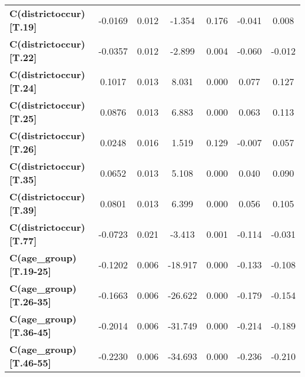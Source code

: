\begin{center}
\begin{tabular}{lcccccc}
\textbf{C(districtoccur)[T.19]}                                                   &      -0.0169  &        0.012     &    -1.354  &         0.176        &       -0.041    &        0.008     \\
\textbf{C(districtoccur)[T.22]}                                                   &      -0.0357  &        0.012     &    -2.899  &         0.004        &       -0.060    &       -0.012     \\
\textbf{C(districtoccur)[T.24]}                                                   &       0.1017  &        0.013     &     8.031  &         0.000        &        0.077    &        0.127     \\
\textbf{C(districtoccur)[T.25]}                                                   &       0.0876  &        0.013     &     6.883  &         0.000        &        0.063    &        0.113     \\
\textbf{C(districtoccur)[T.26]}                                                   &       0.0248  &        0.016     &     1.519  &         0.129        &       -0.007    &        0.057     \\
\textbf{C(districtoccur)[T.35]}                                                   &       0.0652  &        0.013     &     5.108  &         0.000        &        0.040    &        0.090     \\
\textbf{C(districtoccur)[T.39]}                                                   &       0.0801  &        0.013     &     6.399  &         0.000        &        0.056    &        0.105     \\
\textbf{C(districtoccur)[T.77]}                                                   &      -0.0723  &        0.021     &    -3.413  &         0.001        &       -0.114    &       -0.031     \\
\textbf{C(age\_group)[T.19-25]}                                                   &      -0.1202  &        0.006     &   -18.917  &         0.000        &       -0.133    &       -0.108     \\
\textbf{C(age\_group)[T.26-35]}                                                   &      -0.1663  &        0.006     &   -26.622  &         0.000        &       -0.179    &       -0.154     \\
\textbf{C(age\_group)[T.36-45]}                                                   &      -0.2014  &        0.006     &   -31.749  &         0.000        &       -0.214    &       -0.189     \\
\textbf{C(age\_group)[T.46-55]}                                                   &      -0.2230  &        0.006     &   -34.693  &         0.000        &       -0.236    &       -0.210     \\

\end{tabular}
\end{center}
